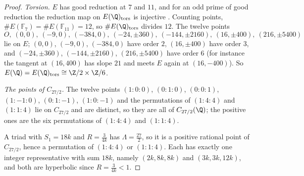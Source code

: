 \begin{proof}
\emph{Torsion.} $E$ has good reduction at $7$ and $11$, and for an odd prime of good reduction the
reduction map on $E(\Q)_{\rm tors}$ is injective \cite[\S3.3, p.~70]{cremona1997}. Counting points,
$\#E(\mathbb F_7)=\#E(\mathbb F_{11})=12$, so $\#E(\Q)_{\rm tors}$ divides $12$. The twelve points
\[
  O,\ (0,0),\ (-9,0),\ (-384,0),\ (-24,\pm360),\ (-144,\pm2160),\ (16,\pm400),\ (216,\pm5400)
\]
lie on $E$; $(0,0)$, $(-9,0)$, $(-384,0)$ have order $2$, $(16,\pm400)$ have order $3$, and
$(-24,\pm360)$, $(-144,\pm2160)$, $(216,\pm5400)$ have order $6$ (for instance the tangent at $(16,400)$ has
slope $21$ and meets $E$ again at $(16,-400)$). So $E(\Q)=E(\Q)_{\rm tors}\cong\Z/2\times\Z/6$.

\emph{The points of $C_{27/2}$.} The twelve points $(1:0:0)$, $(0:1:0)$, $(0:0:1)$, $(1:-1:0)$,
$(0:1:-1)$, $(1:0:-1)$ and the permutations of $(1:4:4)$ and $(1:1:4)$ lie on $C_{27/2}$ and are
distinct, so they are all of $C_{27/2}(\Q)$; the positive ones are the six permutations of $(1:4:4)$
and $(1:1:4)$.

A triad with $S_1=18k$ and $R=\frac3{4k}$ has $\Lambda=\frac{27}2$, so it is a positive rational point of
$C_{27/2}$, hence a permutation of $(1:4:4)$ or $(1:1:4)$. Each has exactly one integer representative
with sum $18k$, namely $(2k,8k,8k)$ and $(3k,3k,12k)$, and both are hyperbolic since $R=\frac3{4k}<1$.
\end{proof}

